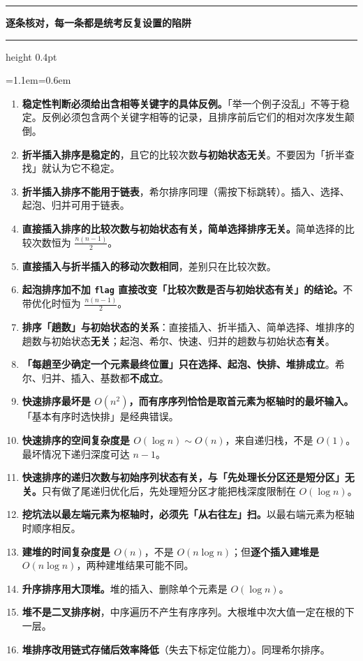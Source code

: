 \documentclass[11pt,openany,UTF8]{ctexbook}
\newcommand{\callouthead}[2]{%
  \par\addvspace{7pt}\noindent
  {\color{#1}\rule[-0.15em]{3pt}{1.05em}}\hspace{0.5em}%
  {\bfseries\color{#1}#2}\par\nobreak\vspace{-0.35em}%
  {\color{rulesep}\hrule height 0.4pt}\nobreak\vspace{0.45em}%
  \begingroup\small\setlength{\parindent}{0pt}%
  \leftskip=1.1em\rightskip=0.6em\noindent\ignorespaces}
\newcommand{\calloutend}{\par\endgroup\addvspace{7pt}}
\newenvironment{callwarn}[1]{\callouthead{warnbar}{#1}}{\calloutend}
\begin{document}
\begin{callwarn}{逐条核对，每一条都是统考反复设置的陷阱}
\begin{enumerate}
\item \textbf{稳定性判断必须给出含相等关键字的具体反例。}「举一个例子没乱」不等于稳定。反例必须包含两个关键字相等的记录，且排序前后它们的相对次序发生颠倒。
\item \textbf{折半插入排序是稳定的}，且它的比较次数\textbf{与初始状态无关}。不要因为「折半查找」就认为它不稳定。
\item \textbf{折半插入排序不能用于链表}，希尔排序同理（需按下标跳转）。插入、选择、起泡、归并可用于链表。
\item \textbf{直接插入排序的比较次数与初始状态有关，简单选择排序无关。}简单选择的比较次数恒为 $\frac{n(n-1)}{2}$。
\item \textbf{直接插入与折半插入的移动次数相同}，差别只在比较次数。
\item \textbf{起泡排序加不加 \texttt{flag} 直接改变「比较次数是否与初始状态有关」的结论。}不带优化时恒为 $\frac{n(n-1)}{2}$。
\item \textbf{排序「趟数」与初始状态的关系}：直接插入、折半插入、简单选择、堆排序的趟数与初始状态\textbf{无关}；起泡、希尔、快速、归并的趟数与初始状态\textbf{有关}。
\item \textbf{「每趟至少确定一个元素最终位置」只在选择、起泡、快排、堆排成立}。希尔、归并、插入、基数都\textbf{不成立}。
\item \textbf{快速排序最坏是 $O(n^2)$，而有序序列恰恰是取首元素为枢轴时的最坏输入。}「基本有序时选快排」是经典错误。
\item \textbf{快速排序的空间复杂度是 $O(\log n)\sim O(n)$}，来自递归栈，不是 $O(1)$。最坏情况下递归深度可达 $n-1$。
\item \textbf{快速排序的递归次数与初始序列状态有关，与「先处理长分区还是短分区」无关。}只有做了尾递归优化后，先处理短分区才能把栈深度限制在 $O(\log n)$。
\item \textbf{挖坑法以最左端元素为枢轴时，必须先「从右往左」扫。}以最右端元素为枢轴时顺序相反。
\item \textbf{建堆的时间复杂度是 $O(n)$}，不是 $O(n\log n)$；但\textbf{逐个插入建堆是 $O(n\log n)$}，两种建堆结果可能不同。
\item \textbf{升序排序用大顶堆。}堆的插入、删除单个元素是 $O(\log n)$。
\item \textbf{堆不是二叉排序树}，中序遍历不产生有序序列。大根堆中次大值一定在根的下一层。
\item \textbf{堆排序改用链式存储后效率降低}（失去下标定位能力）。同理希尔排序。

\end{enumerate}
\end{callwarn}
\end{document}
